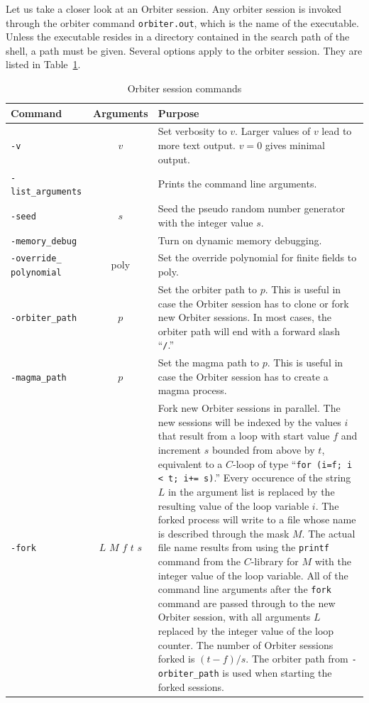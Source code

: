 Let us take a closer look at an Orbiter session.
Any orbiter session is invoked through the orbiter command \verb'orbiter.out', which is the name of the executable. 
Unless the executable resides in a directory contained in the search path of the shell, 
a path must be given. 
Several options apply to the orbiter session. They are listed in Table~\ref{tab:session}.
\begin{table}
\begin{center}
	\begin{tabular}{|p{4cm}|c|p{8cm}|}
	\hline
	Command & Arguments & Purpose \\
	\hline
	\hline
	\verb'-v' & $v$ & Set verbosity to $v$. Larger values of $v$ lead to more text output. $v=0$ gives minimal output. \\
	\hline
	\verb'-list_arguments' & & Prints the command line arguments. \\
	\hline
	\verb'-seed' & $s$ & Seed the pseudo random number generator with the integer value $s$. \\
	\hline
	\verb'-memory_debug' &  & Turn on dynamic memory debugging.\\
	\hline
	\verb'-override_' \verb'polynomial' & poly & Set the override polynomial for finite fields to poly.  \\
	\hline
	\verb'-orbiter_path' & $p$ & Set the orbiter path to $p$. This is useful in case the Orbiter session has to clone or fork new Orbiter sessions. In most cases, the orbiter path will end with a forward slash ``\verb'/'.'' \\
	\hline
	\verb'-magma_path' & $p$ & Set the magma path to $p$. This is useful in case the Orbiter session has to create a magma process.\\
	\hline
	\verb'-fork' & $L$ $M$ $f$ $t$ $s$ & 
Fork new Orbiter sessions in parallel. The new sessions will be indexed by the values $i$ 
that result from a loop with start value $f$ and increment $s$ bounded from above by $t$, 
equivalent to a $C$-loop of type ``\verb'for (i=f; i < t; i+= s)'.'' 
Every occurence of the string $L$ in the argument list is replaced by the resulting value of the loop variable $i$. 
The forked process will write to a file whose name is described through the mask $M.$ 
The actual file name results from using the \verb'printf' command 
from the $C$-library for $M$ with the integer value of the loop variable. 
All of the command line arguments after the \verb'fork' command are passed through to the new Orbiter session, 
with all arguments $L$ replaced by the integer value of the loop counter. 
The number of Orbiter sessions forked is $(t-f)/s.$ 
The orbiter path from \verb'-orbiter_path' is used when starting the forked sessions.\\
	\hline
	\end{tabular}
\end{center}
\caption{\label{tab:session}Orbiter session commands}
\end{table}

